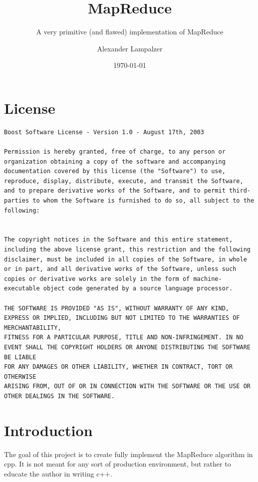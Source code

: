 \documentclass[a4paper]{article}
\title{MapReduce}
\subtitle{A very primitive (and flawed) implementation of MapReduce}
\author{Alexander Lampalzer}
\date{\today}
\begin{document}
\begin{titlepage}
\maketitle
\end{titlepage}

\tableofcontents
\thispagestyle{empty}
\newpage

\hypertarget{License}{%
\section{License}\label{License}}
\begin{lstlisting}
Boost Software License - Version 1.0 - August 17th, 2003

Permission is hereby granted, free of charge, to any person or organization obtaining a copy of the software and accompanying documentation covered by this license (the "Software") to use, reproduce, display, distribute, execute, and transmit the Software, and to prepare derivative works of the Software, and to permit third-parties to whom the Software is furnished to do so, all subject to the following:


The copyright notices in the Software and this entire statement, including the above license grant, this restriction and the following disclaimer, must be included in all copies of the Software, in whole or in part, and all derivative works of the Software, unless such copies or derivative works are solely in the form of machine-executable object code generated by a source language processor.

THE SOFTWARE IS PROVIDED "AS IS", WITHOUT WARRANTY OF ANY KIND, EXPRESS OR IMPLIED, INCLUDING BUT NOT LIMITED TO THE WARRANTIES OF MERCHANTABILITY,
FITNESS FOR A PARTICULAR PURPOSE, TITLE AND NON-INFRINGEMENT. IN NO EVENT SHALL THE COPYRIGHT HOLDERS OR ANYONE DISTRIBUTING THE SOFTWARE BE LIABLE
FOR ANY DAMAGES OR OTHER LIABILITY, WHETHER IN CONTRACT, TORT OR OTHERWISE 
ARISING FROM, OUT OF OR IN CONNECTION WITH THE SOFTWARE OR THE USE OR OTHER DEALINGS IN THE SOFTWARE.
\end{lstlisting}

\newpage

\hypertarget{Introduction}{%
\section{Introduction}\label{Introduction}}

The goal of this project is to create fully implement the MapReduce algorithm in cpp. It is not meant for any sort of production environment, but rather to educate the author in writing c++.
\end{document}
